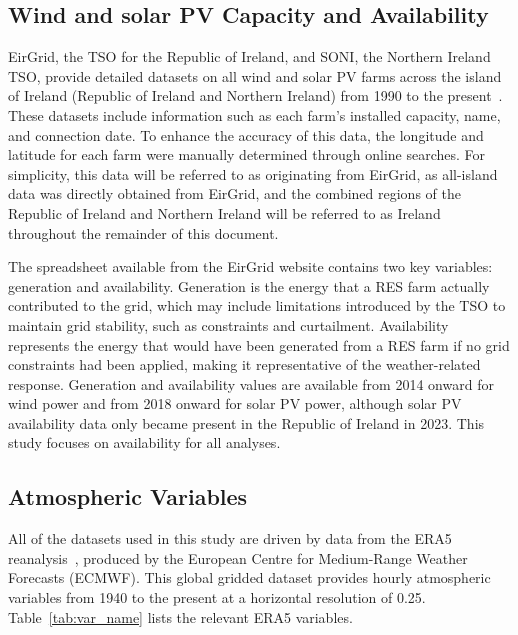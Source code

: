 \documentclass[preprint, 12pt]{elsarticle}
\begin{document}
\subsection{Wind and solar PV Capacity and Availability}
\label{sec:eirgrid}

EirGrid, the TSO for the Republic of Ireland, and SONI, the Northern Ireland TSO, provide detailed datasets on all wind and solar PV farms across the island of Ireland (Republic of Ireland and Northern Ireland) from 1990 to the present~\citep{eirgrid2023spreadsheet}. These datasets include information such as each farm’s installed capacity, name, and connection date. To enhance the accuracy of this data, the longitude and latitude for each farm were manually determined through online searches. For simplicity, this data will be referred to as originating from EirGrid, as all-island data was directly obtained from EirGrid, and the combined regions of the Republic of Ireland and Northern Ireland will be referred to as Ireland throughout the remainder of this document.

The spreadsheet available from the EirGrid website contains two key variables: generation and availability. Generation is the energy that a RES farm actually contributed to the grid, which may include limitations introduced by the TSO to maintain grid stability, such as constraints and curtailment. Availability represents the energy that would have been generated from a RES farm if no grid constraints had been applied, making it representative of the weather-related response. Generation and availability values are available from 2014 onward for wind power and from 2018 onward for solar PV power, although solar PV availability data only became present in the Republic of Ireland in 2023. This study focuses on availability for all analyses.

\subsection{Atmospheric Variables}
\label{sec:era5}

All of the datasets used in this study are driven by data from the ERA5 reanalysis~\citep{hersbach2020era5}, produced by the European Centre for Medium-Range Weather Forecasts (ECMWF). This global gridded dataset provides hourly atmospheric variables from 1940 to the present at a horizontal resolution of 0.25\textdegree. Table~\ref{tab:var_name} lists the relevant ERA5 variables.
\end{document}
